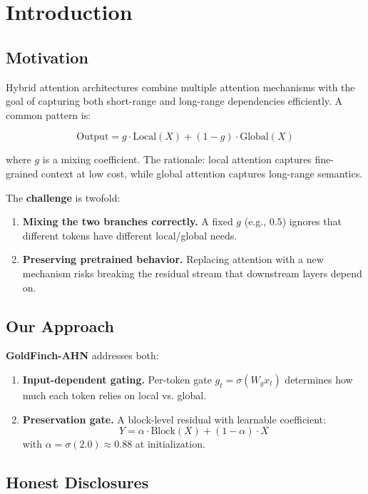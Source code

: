 
\section{Introduction}

\subsection{Motivation}

Hybrid attention architectures combine multiple attention mechanisms with 
the goal of capturing both short-range and long-range dependencies 
efficiently. A common pattern is:

\[
\text{Output} = g \cdot \text{Local}(X) + (1 - g) \cdot \text{Global}(X)
\tag{1.1}
\]

where $g$ is a mixing coefficient. The rationale: local attention captures 
fine-grained context at low cost, while global attention captures long-range 
semantics.

The \textbf{challenge} is twofold:

\begin{enumerate}
\item \textbf{Mixing the two branches correctly.} A fixed $g$ (e.g., $0.5$) ignores
  that different tokens have different local/global needs.
\item \textbf{Preserving pretrained behavior.} Replacing attention with a new
  mechanism risks breaking the residual stream that downstream layers
  depend on.

\end{enumerate}
\subsection{Our Approach}

\textbf{GoldFinch-AHN} addresses both:

\begin{enumerate}
\item \textbf{Input-dependent gating.} Per-token gate $g_t = \sigma(W_g x_t)$
  determines how much each token relies on local vs. global.
\item \textbf{Preservation gate.} A block-level residual with learnable coefficient:
  $$
  Y = \alpha \cdot \text{Block}(X) + (1 - \alpha) \cdot X
  \tag{1.2}
  $$
  with $\alpha = \sigma(2.0) \approx 0.88$ at initialization.

\end{enumerate}
\subsection{Honest Disclosures}

